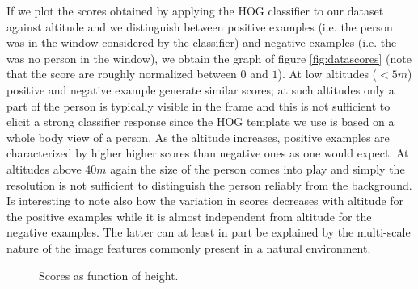 \documentclass[a4paper,11pt]{report}
\begin{document}
If we plot the scores obtained by applying the HOG classifier to our dataset against altitude and we distinguish between positive examples (i.e. the person was in the window considered by the classifier) and negative examples (i.e. the was no person in the window), we obtain the graph of figure \ref{fig:datascores} (note that the score are roughly normalized between $0$ and $1$).
At low altitudes ($<5m$) positive and negative example generate similar scores; at such altitudes only a part of the person is typically visible in the frame and this is not sufficient to elicit a strong classifier response since the HOG template we use is based on a whole body view of a person. As the altitude increases, positive examples are characterized by higher higher scores than negative ones as one would expect. At altitudes above $40m$ again the size of the person comes into play and simply the resolution is not sufficient to distinguish the person reliably from the background.
Is interesting to note also how the variation in scores decreases with altitude for the positive examples while it is almost independent from altitude for the negative examples. The latter can at least in part be explained by the multi-scale nature of the image features commonly present in a natural environment.   

\begin{figure}[ht]
\centering
{}
\quad
{}
\caption{Scores as function of height.\label{fig:dataandmodels}}
\end{figure}
\end{document}

